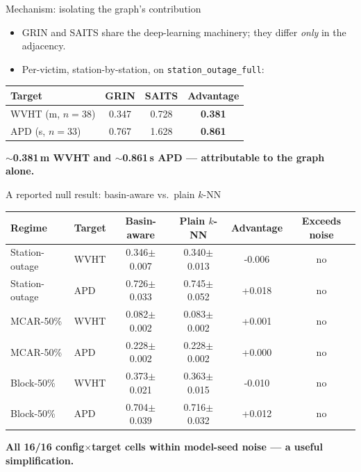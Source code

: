 \documentclass[aspectratio=169]{beamer}
\newcommand{\take}[1]{\vspace{0.6ex}\begin{center}\textbf{\color{colgraph}#1}\end{center}}
\begin{document}
\begin{frame}{Mechanism: isolating the graph's contribution}
  \begin{itemize}
    \item GRIN and SAITS share the deep-learning machinery; they differ \emph{only} in the adjacency.
    \item Per-victim, station-by-station, on \texttt{station\_outage\_full}:
  \end{itemize}
  \begin{center}
  \begin{tabular}{l ccc}
    \toprule
    Target & GRIN & SAITS & Advantage\\
    \midrule
    WVHT (m, $n=$38) & 0.347 & 0.728 & \textbf{0.381}\\
    APD (s, $n=$33) & 0.767 & 1.628 & \textbf{0.861}\\
    \bottomrule
  \end{tabular}
  \end{center}
  \take{$\sim$0.381\,m WVHT and $\sim$0.861\,s APD --- attributable to the graph alone.}
\end{frame}

\begin{frame}{A reported null result: basin-aware vs.\ plain $k$-NN}
  \begin{center}\footnotesize
  \begin{tabular}{l l ccc c}
    \toprule
    Regime & Target & Basin-aware & Plain $k$-NN & Advantage & Exceeds noise\\
    \midrule
Station-outage & WVHT & 0.346$\pm$0.007 & 0.340$\pm$0.013 & -0.006 & no \\
Station-outage & APD & 0.726$\pm$0.033 & 0.745$\pm$0.052 & +0.018 & no \\
MCAR-50\% & WVHT & 0.082$\pm$0.002 & 0.083$\pm$0.002 & +0.001 & no \\
MCAR-50\% & APD & 0.228$\pm$0.002 & 0.228$\pm$0.002 & +0.000 & no \\
Block-50\% & WVHT & 0.373$\pm$0.021 & 0.363$\pm$0.015 & -0.010 & no \\
Block-50\% & APD & 0.704$\pm$0.039 & 0.716$\pm$0.032 & +0.012 & no \\
    \bottomrule
  \end{tabular}
  \end{center}
  \take{All 16/16 config$\times$target cells within model-seed noise --- a useful simplification.}
\end{frame}
\end{document}

